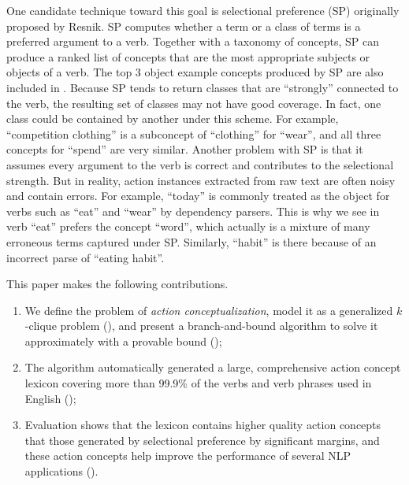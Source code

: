One candidate technique toward this goal is selectional preference
(SP) originally proposed by Resnik\cite{resnik1996selectional}.
SP computes whether a term or a class of terms is a preferred argument
to a verb. Together with a taxonomy of concepts,
SP can produce a ranked list of concepts that are the most appropriate
subjects or objects of a verb. The top 3 object example concepts produced
by SP are also included in .
Because SP tends to return classes
that are ``strongly'' connected to the verb,
the resulting set of classes may not have good coverage.
In fact, one class could be contained by another under
this scheme. For example,
``competition clothing'' is a subconcept
of ``clothing'' for ``wear'', and all three concepts for ``spend''
are very similar. Another problem with SP is that it assumes
every argument to the verb is correct and contributes to
the selectional strength. But in reality, action instances extracted
from raw text are often noisy and contain errors.
For example, ``today'' is commonly treated as the object
for verbs such as ``eat'' and ``wear'' by dependency parsers.
This is why we see in 
verb ``eat'' prefers the concept ``word'', which actually
is a mixture of many erroneous terms captured under SP. Similarly,
``habit'' is there because of an incorrect parse of ``eating habit''.

This paper makes the following contributions.
\begin{enumerate}
\item We define the problem of {\em action conceptualization},
model it as a generalized $k$-clique problem (),
and present a branch-and-bound algorithm to solve it approximately with
a provable bound ();
\item The algorithm automatically generated a large, comprehensive
action concept lexicon covering more than 99.9\% of the verbs and verb phrases
used in English ();
\item Evaluation shows that the lexicon contains higher quality action concepts
that those generated by selectional preference by significant margins, and
these action concepts help improve the performance of several
NLP applications ().
\end{enumerate}

